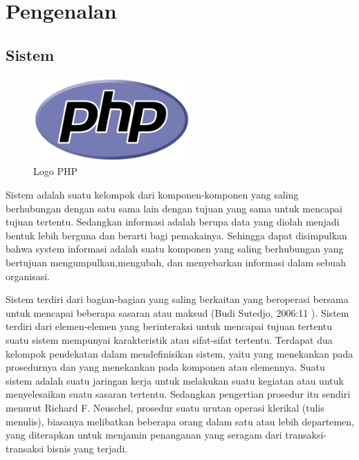 \section{Pengenalan}
\subsection{Sistem}
	\begin{figure}[H]
		\includegraphics[width=6cm]{figures/web/php.png}
		\centering
		\caption{Logo PHP}
	\end{figure}
Sistem adalah suatu kelompok dari komponen-komponen yang saling berhubungan dengan satu sama lain dengan tujuan yang sama untuk mencapai tujuan tertentu. Sedangkan informasi adalah berupa data yang diolah menjadi bentuk lebih berguna dan berarti bagi pemakainya. Sehingga dapat disimpulkan bahwa system informasi adalah suatu komponen yang saling berhubungan yang bertujuan mengumpulkan,mengubah, dan menyebarkan informasi dalam sebuah organisasi.

Sistem terdiri dari bagian-bagian yang saling berkaitan yang beroperasi bersama untuk mencapai beberapa sasaran atau maksud (Budi Sutedjo, 2006:11 ). Sistem terdiri dari elemen-elemen yang berinteraksi untuk mencapai tujuan tertentu suatu sistem mempunyai karakteristik atau sifat-sifat tertentu. Terdapat dua kelompok pendekatan dalam mendefinisikan sistem, yaitu yang menekankan pada prosedurnya dan yang menekankan pada komponen atau elemennya. 
Suatu sistem adalah suatu jaringan kerja untuk melakukan suatu kegiatan atau untuk menyelesaikan suatu sasaran tertentu. Sedangkan pengertian prosedur itu sendiri menurut Richard F. Neuschel, prosedur suatu urutan operasi klerikal (tulis menulis), biasanya melibatkan beberapa orang dalam satu atau lebih departemen, yang diterapkan untuk menjamin penanganan yang seragam dari transaksi-transaksi bisnis yang terjadi.

